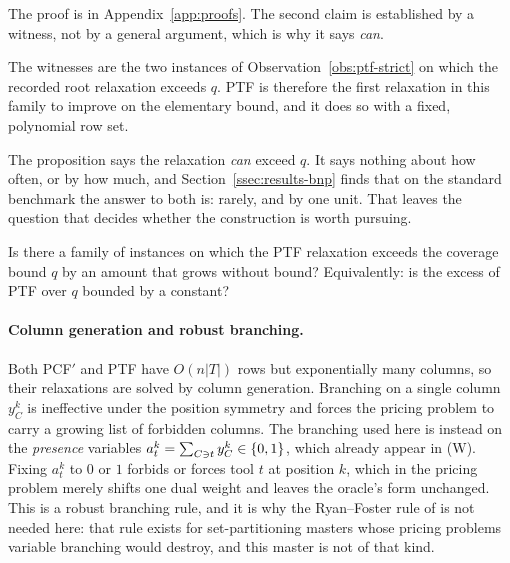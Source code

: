 The proof is in Appendix~\ref{app:proofs}. The second claim is established by a
witness, not by a general argument, which is why it says \emph{can}.

The witnesses are the two instances of Observation~\ref{obs:ptf-strict} on which the
recorded root relaxation exceeds $q$. PTF is therefore the first relaxation in this
family to improve on the elementary bound, and it does so with a fixed, polynomial row
set.

The proposition says the relaxation \emph{can} exceed $q$. It says nothing about how
often, or by how much, and Section~\ref{ssec:results-bnp} finds that on the standard
benchmark the answer to both is: rarely, and by one unit. That leaves the question that
decides whether the construction is worth pursuing.

\begin{problem}\label{prob:ptf-gap}
Is there a family of instances on which the PTF relaxation exceeds the coverage bound
$q$ by an amount that grows without bound? Equivalently: is the excess of PTF over $q$
bounded by a constant?
\end{problem}

\paragraph{Column generation and robust branching.}
Both PCF$'$ and PTF have $O(n\lvert T\rvert)$ rows but exponentially many columns, so
their relaxations are solved by column generation. Branching on a single column
$y_C^{k}$ is ineffective under the position symmetry and forces the pricing problem to
carry a growing list of forbidden columns. The branching used here is instead on the
\emph{presence} variables $a_t^{k}=\sum_{C\ni t}y_C^{k}\in\{0,1\}$, which already
appear in (W). Fixing $a_t^{k}$ to $0$ or $1$ forbids or forces tool $t$ at position
$k$, which in the pricing problem merely shifts one dual weight and leaves the
oracle's form unchanged. This is a robust branching rule, and it is why the
Ryan--Foster rule of \citet{Ryan1981} is not needed here: that rule exists for
set-partitioning masters whose pricing problems variable branching would destroy, and
this master is not of that kind.

